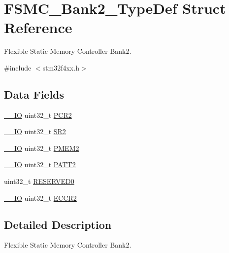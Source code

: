 \hypertarget{struct_f_s_m_c___bank2___type_def}{\section{F\-S\-M\-C\-\_\-\-Bank2\-\_\-\-Type\-Def Struct Reference}
\label{struct_f_s_m_c___bank2___type_def}
}


Flexible Static Memory Controller Bank2.  




{\ttfamily \#include $<$stm32f4xx.\-h$>$}

\subsection*{Data Fields}
\begin{DoxyCompactItemize}
\item 
\hyperlink{group___c_m_s_i_s__core__definitions_gaec43007d9998a0a0e01faede4133d6be}{\-\_\-\-\_\-\-I\-O} uint32\-\_\-t \hyperlink{struct_f_s_m_c___bank2___type_def_ab0cb1d704ee64c62ad5be55522a2683a}{P\-C\-R2}
\item 
\hyperlink{group___c_m_s_i_s__core__definitions_gaec43007d9998a0a0e01faede4133d6be}{\-\_\-\-\_\-\-I\-O} uint32\-\_\-t \hyperlink{struct_f_s_m_c___bank2___type_def_a89623ee198737b29dc0a803310605a83}{S\-R2}
\item 
\hyperlink{group___c_m_s_i_s__core__definitions_gaec43007d9998a0a0e01faede4133d6be}{\-\_\-\-\_\-\-I\-O} uint32\-\_\-t \hyperlink{struct_f_s_m_c___bank2___type_def_a2e5a7a96de68a6612affa6df8c309c3d}{P\-M\-E\-M2}
\item 
\hyperlink{group___c_m_s_i_s__core__definitions_gaec43007d9998a0a0e01faede4133d6be}{\-\_\-\-\_\-\-I\-O} uint32\-\_\-t \hyperlink{struct_f_s_m_c___bank2___type_def_a9c1bc909ec5ed32df45444488ea6668b}{P\-A\-T\-T2}
\item 
uint32\-\_\-t \hyperlink{struct_f_s_m_c___bank2___type_def_af86c61a5d38a4fc9cef942a12744486b}{R\-E\-S\-E\-R\-V\-E\-D0}
\item 
\hyperlink{group___c_m_s_i_s__core__definitions_gaec43007d9998a0a0e01faede4133d6be}{\-\_\-\-\_\-\-I\-O} uint32\-\_\-t \hyperlink{struct_f_s_m_c___bank2___type_def_a05a47a1664adc7a3db3fa3e83fe883b4}{E\-C\-C\-R2}
\end{DoxyCompactItemize}


\subsection{Detailed Description}
Flexible Static Memory Controller Bank2. 

